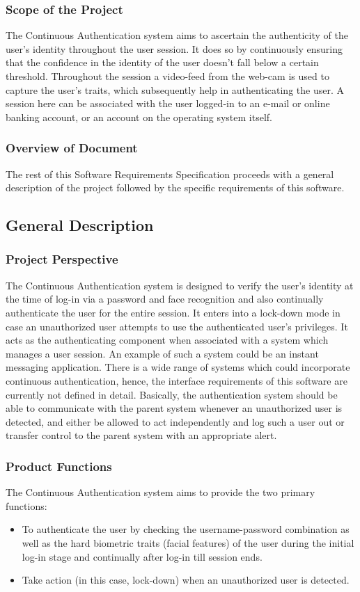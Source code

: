 \documentclass[12pt]{article}			%
\begin{document}
\subsubsection{ Scope of the Project }
The Continuous Authentication system aims to ascertain the authenticity of the user's identity throughout the user session. It does so by continuously ensuring that the confidence in the identity of the user doesn't fall below a certain threshold. Throughout the session a video-feed from the web-cam is used to capture the user's traits, which subsequently help in authenticating the user. A session here can be associated with the user logged-in to an e-mail or online banking account, or an account on the operating system itself.

\subsubsection{ Overview of Document }
The rest of this Software Requirements Specification proceeds with a general description of the project followed by the specific requirements of this software. 

\subsection{ General Description }
\subsubsection{ Project Perspective }
The Continuous Authentication system is designed to verify the user's identity at the time of log-in via a password and face recognition and also continually authenticate the user for the entire session. It enters into a lock-down mode in case an unauthorized user attempts to use the authenticated user's privileges.
It acts as the authenticating component when associated with a system which manages a user session. An example of such a system could be an instant messaging application. There is a wide range of systems which could incorporate continuous authentication, hence, the interface requirements of this software are currently not defined in detail. Basically, the authentication system should be able to communicate with the parent system whenever an unauthorized user is detected, and either be allowed to act independently and log such a user out or transfer control to the parent system with an appropriate alert.

\subsubsection{ Product Functions }
The Continuous Authentication system aims to provide the two primary functions:
\begin{itemize}
	\item To authenticate the user by checking the username-password combination as well as the hard biometric traits (facial features) of the user during the initial log-in stage and continually after log-in till session ends.
	\item Take action (in this case, lock-down) when an unauthorized user is detected.
\end{itemize}
\end{document}
